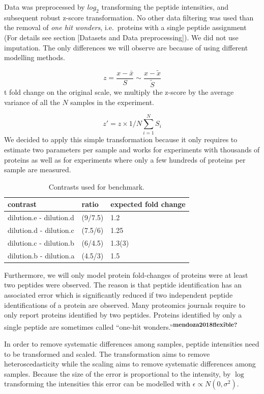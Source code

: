 \documentclass[journal=jacsat,manuscript=article]{achemso}
\begin{document}
Data was preprocessed by \(log_2\) transforming the peptide intensities,
and subsequent robust z-score transformation. No other data filtering
was used than the removal of \emph{one hit wonders}, i.e.~proteins with
a single peptide assignment (For details see section {[}Datasets and
Data preprocessing{]}). We did not use imputation. The only differences
we will observe are because of using different modelling methods.

\[
z = \frac{x - \bar{x}}{S} \sim \frac{x - \tilde{x}}{\tilde{S}}
\] t fold change on the original scale, we multiply the z-score by the
average variance of all the \(N\) samples in the experiment.

\[
z' = z \times 1/N\sum_{i=1}^N S_i
\] We decided to apply this simple transformation because it only
requires to estimate two parameters per sample and works for experiments
with thousands of proteins as well as for experiments where only a few
hundreds of proteins per sample are measured.

\begin{table}

\caption{\label{tab:usedContrasts}Contrasts used for benchmark.}
\centering
\begin{tabular}[t]{l|l|l}
\hline
contrast & ratio & expected fold change\\
\hline
dilution.e - dilution.d & (9/7.5) & 1.2\\
\hline
dilution.d - dilution.c & (7.5/6) & 1.25\\
\hline
dilution.c - dilution.b & (6/4.5) & 1.3(3)\\
\hline
dilution.b - dilution.a & (4.5/3) & 1.5\\
\hline
\end{tabular}
\end{table}

Furthermore, we will only model protein fold-changes of proteins were at
least two peptides were observed. The reason is that peptide
identification has an associated error which is significantly reduced if
two independent peptide identifications of a protein are observed. Many
proteomics journals require to only report proteins identified by two
peptides. Proteins identified by only a single peptide are sometimes
called ``one-hit
wonders.''\textsuperscript{\textbf{mendoza2018flexible?}}

In order to remove systematic differences among samples, peptide
intensities need to be transformed and scaled. The transformation aims
to remove heteroscedasticity while the scaling aims to remove systematic
differences among samples. Because the size of the error is proportional
to the intensity, by \(\log\) transforming the intensities this error
can be modelled with \(\epsilon \propto N(0, \sigma^2)\).
\end{document}
